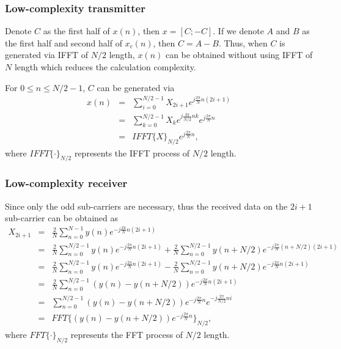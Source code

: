 \documentclass[8 pt]{beamer} %
\begin{document}
\begin{frame}
\frametitle{Low-complexity transmitter}
Denote $ C $ as the first half of $ x(n) $, then $ x=[C;-C] $. If we denote $ A $ and $ B $ as the first half and second half of $ x_c(n) $, then $ C = A - B $. Thus, when $ C $ is generated via IFFT of $ N/2 $ length, $ x(n) $ can be obtained without using IFFT of $ N $ length which reduces the calculation complexity.

For $ 0\leq n \leq N/2-1 $, $ C $ can be generated via		
		\begin{eqnarray}\label{equ:sim_transmitter}
			x(n) &=& \sum_{i=0}^{N/2-1} X_{2i+1}e^{j\frac{2\pi}{N}n(2i+1)} \nonumber\\
				 &=& \sum_{k=0}^{N/2-1} X_{k} e^{j\frac{2\pi}{N/2}nk}e^{j\frac{2\pi}{N}n} \nonumber\\
				 &=& IFFT\{X\}_{N/2}e^{j\frac{2\pi}{N}n},
		\end{eqnarray}
		where $ IFFT\{\cdot\}_{N/2} $	represents the IFFT process of $ N/2 $ length.
		
\end{frame}

\begin{frame}
\frametitle{Low-complexity receiver}
Since only the odd sub-carriers are necessary, thus the received data on the $ 2i+1 $ sub-carrier can be obtained as
\begin{eqnarray}\label{equ:sim_receiver}
    X_{2i+1}&=& \frac{2}{N}\sum_{n=0}^{N-1} y(n) e^{-j\frac{2\pi}{N}n(2i+1)}\nonumber\\
	&=& \frac{2}{N}\sum_{n=0}^{N/2-1} y(n) e^{-j\frac{2\pi}{N}n(2i+1)}  
	+ \frac{2}{N}\sum_{n=0}^{N/2-1} y(n+N/2) e^{-j\frac{2\pi}{N}(n+N/2)(2i+1)} \nonumber\\
	&=& \frac{2}{N}\sum_{n=0}^{N/2-1} y(n) e^{-j\frac{2\pi}{N}n(2i+1)}  
	- \frac{2}{N}\sum_{n=0}^{N/2-1} y(n+N/2) e^{-j\frac{2\pi}{N}n(2i+1)} \nonumber\\
	&=& \frac{2}{N}\sum_{n=0}^{N/2-1} ( y(n)-y(n+N/2) ) e^{-j\frac{2\pi}{N}n(2i+1)}  \nonumber\\
	&=& \sum_{n=0}^{N/2-1} ( y(n)-y(n+N/2) ) e^{-j\frac{2\pi}{N}n} e^{-j\frac{2\pi}{N/2}ni} \nonumber\\
	&=& FFT\{ ( y(n)-y(n+N/2)) e^{-j\frac{2\pi}{N}n} \}_{N/2},
\end{eqnarray}
where $ FFT\{\cdot\}_{N/2} $	represents the FFT process of $ N/2 $ length.
		
\end{frame}
\end{document}
